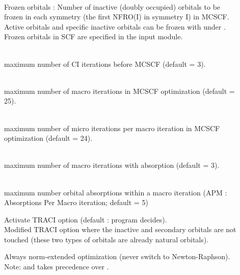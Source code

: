 \begin{description}
\item[]
   \\
  Frozen orbitals : Number of inactive (doubly occupied) orbitals to be frozen
  in each symmetry (the first NFRO(I) in symmetry I) in MCSCF.
  Active orbitals and specific inactive orbitals can be frozen with 
  under .
  Frozen orbitals in SCF are specified in the  input module.

\item[]
   \\
  maximum number of CI iterations before MCSCF (default = 3).

\item[]
   \\
  maximum number of macro iterations in MCSCF optimization (default = 25).

\item[]
   \\
  maximum number of micro iterations per macro iteration in MCSCF optimization
  (default = 24).

\item[]
   \\
  maximum number of macro iterations with 
  absorption (default = 3).

\item[]
   \\
  maximum number orbital absorptions within
  a macro iteration
  (APM : Absorptions Per Macro iteration; default = 5)

\item[]
  Activate TRACI option (default : program decides).\\
  Modified TRACI option where the inactive and secondary orbitals are not
  touched (these two types of orbitals are already natural orbitals).

\item[]
  Always norm-extended optimization (never switch to New\-ton-Raph\-son).
  Note:  and 
  takes precedence over .


\end{description}
